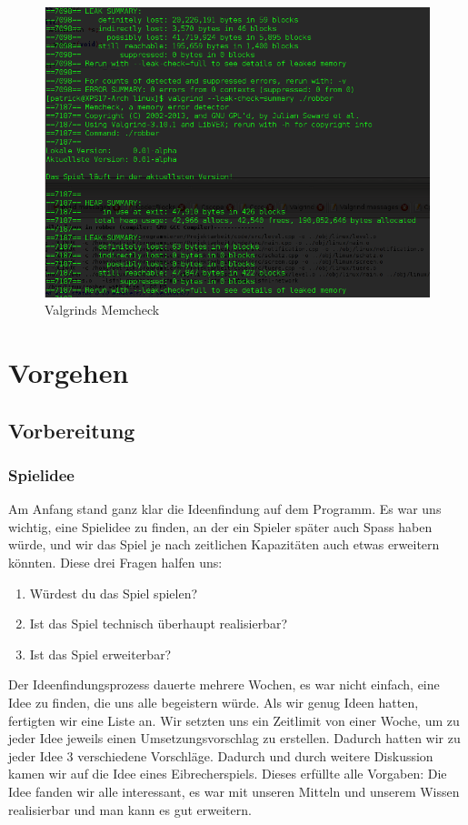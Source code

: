 \documentclass[12pt,a4paper]{scrartcl}
\begin{document}
\begin{figure}
\centering
\includegraphics[scale=0.8]{img/valgrind2.png}
\caption{Valgrinds Memcheck}
\end{figure}


\newpage
\section{Vorgehen}
\subsection{Vorbereitung}
\subsubsection{Spielidee}
Am Anfang stand ganz klar die Ideenfindung auf dem Programm. Es war uns wichtig,
eine Spielidee zu finden, an der ein Spieler später auch Spass haben würde,
und wir das Spiel je nach zeitlichen Kapazitäten auch etwas erweitern könnten.
Diese drei Fragen halfen uns:
\begin{enumerate}
\item Würdest du das Spiel spielen?
\item Ist das Spiel technisch überhaupt realisierbar?
\item Ist das Spiel erweiterbar?
\end{enumerate}
Der Ideenfindungsprozess dauerte mehrere Wochen, es war nicht einfach, eine Idee
zu finden, die uns alle begeistern würde. 
Als wir genug Ideen hatten, fertigten wir eine Liste an. 
Wir setzten uns ein Zeitlimit von einer Woche, um zu jeder Idee jeweils einen Umsetzungsvorschlag zu erstellen. 
Dadurch hatten wir zu jeder Idee 3 verschiedene Vorschläge.
Dadurch und durch weitere Diskussion kamen wir auf die Idee eines Eibrecherspiels.
Dieses erfüllte alle Vorgaben:
Die Idee fanden wir alle interessant, es war mit unseren Mitteln und unserem Wissen realisierbar und man kann es gut erweitern.
\end{document}
